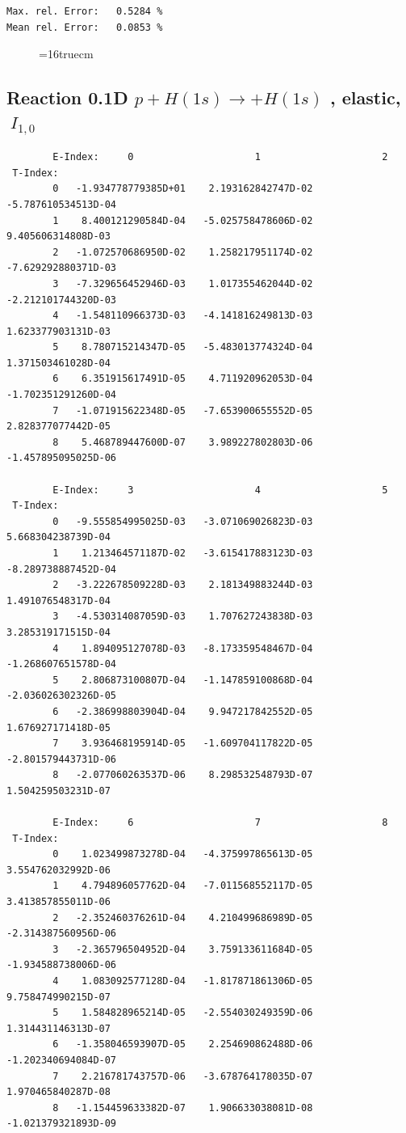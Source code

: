 \documentclass[12pt,dvips]{article}
\begin{document}
\begin{small}
\begin{verbatim}
Max. rel. Error:   0.5284 %
Mean rel. Error:   0.0853 %
\end{verbatim}\end{small}
\begin{figure} \label{0.1T}
\epsfxsize=16truecm
\end{figure}
\newpage


\subsection{
Reaction 0.1D  $p + H(1s) \rightarrow  + H(1s)$ ,
elastic, $\ I_{1,0}$
}

\begin{small}\begin{verbatim}
        E-Index:     0                     1                     2
 T-Index:
        0   -1.934778779385D+01    2.193162842747D-02   -5.787610534513D-04
        1    8.400121290584D-04   -5.025758478606D-02    9.405606314808D-03
        2   -1.072570686950D-02    1.258217951174D-02   -7.629292880371D-03
        3   -7.329656452946D-03    1.017355462044D-02   -2.212101744320D-03
        4   -1.548110966373D-03   -4.141816249813D-03    1.623377903131D-03
        5    8.780715214347D-05   -5.483013774324D-04    1.371503461028D-04
        6    6.351915617491D-05    4.711920962053D-04   -1.702351291260D-04
        7   -1.071915622348D-05   -7.653900655552D-05    2.828377077442D-05
        8    5.468789447600D-07    3.989227802803D-06   -1.457895095025D-06

        E-Index:     3                     4                     5
 T-Index:
        0   -9.555854995025D-03   -3.071069026823D-03    5.668304238739D-04
        1    1.213464571187D-02   -3.615417883123D-03   -8.289738887452D-04
        2   -3.222678509228D-03    2.181349883244D-03    1.491076548317D-04
        3   -4.530314087059D-03    1.707627243838D-03    3.285319171515D-04
        4    1.894095127078D-03   -8.173359548467D-04   -1.268607651578D-04
        5    2.806873100807D-04   -1.147859100868D-04   -2.036026302326D-05
        6   -2.386998803904D-04    9.947217842552D-05    1.676927171418D-05
        7    3.936468195914D-05   -1.609704117822D-05   -2.801579443731D-06
        8   -2.077060263537D-06    8.298532548793D-07    1.504259503231D-07

        E-Index:     6                     7                     8
 T-Index:
        0    1.023499873278D-04   -4.375997865613D-05    3.554762032992D-06
        1    4.794896057762D-04   -7.011568552117D-05    3.413857855011D-06
        2   -2.352460376261D-04    4.210499686989D-05   -2.314387560956D-06
        3   -2.365796504952D-04    3.759133611684D-05   -1.934588738006D-06
        4    1.083092577128D-04   -1.817871861306D-05    9.758474990215D-07
        5    1.584828965214D-05   -2.554030249359D-06    1.314431146313D-07
        6   -1.358046593907D-05    2.254690862488D-06   -1.202340694084D-07
        7    2.216781743757D-06   -3.678764178035D-07    1.970465840287D-08
        8   -1.154459633382D-07    1.906633038081D-08   -1.021379321893D-09


\end{verbatim}
\end{small}
\end{document}

